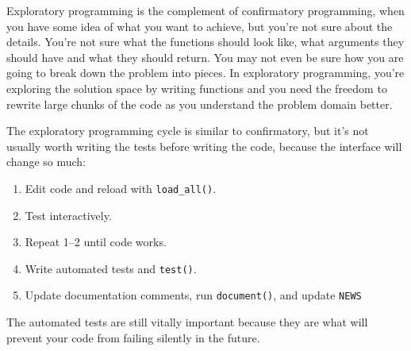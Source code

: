 Exploratory programming is the complement of confirmatory programming,
when you have some idea of what you want to achieve, but you're not sure
about the details. You're not sure what the functions should look like,
what arguments they should have and what they should return. You may not
even be sure how you are going to break down the problem into pieces. In
exploratory programming, you're exploring the solution space by writing
functions and you need the freedom to rewrite large chunks of the code
as you understand the problem domain better.

The exploratory programming cycle is similar to confirmatory, but it's
not usually worth writing the tests before writing the code, because the
interface will change so much:

\begin{enumerate}
\def\labelenumi{\arabic{enumi}.}
\item
  Edit code and reload with \texttt{load\_all()}.
\item
  Test interactively.
\item
  Repeat 1--2 until code works.
\item
  Write automated tests and \texttt{test()}.
\item
  Update documentation comments, run \texttt{document()}, and update
  \texttt{NEWS}
\end{enumerate}

The automated tests are still vitally important because they are what
will prevent your code from failing silently in the future.
